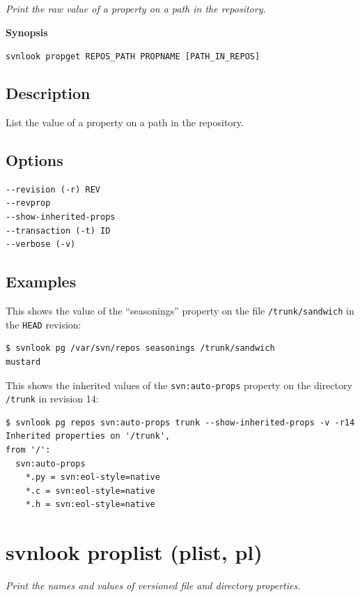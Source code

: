 \emph{Print the raw value of a property on a path in the repository.}

\textbf{Synopsis}

\texttt{svnlook\ propget\ REPOS\_PATH\ PROPNAME\ {[}PATH\_IN\_REPOS{]}}

\subsection{Description}

List the value of a property on a path in the repository.

\subsection{Options}

\begin{verbatim}
--revision (-r) REV
--revprop
--show-inherited-props
--transaction (-t) ID
--verbose (-v)
\end{verbatim}

\subsection{Examples}

This shows the value of the ``seasonings'' property on the file
\texttt{/trunk/sandwich} in the \texttt{HEAD} revision:

\begin{verbatim}
$ svnlook pg /var/svn/repos seasonings /trunk/sandwich
mustard
\end{verbatim}

This shows the inherited values of the \texttt{svn:auto-props} property
on the directory \texttt{/trunk} in revision 14:

\begin{verbatim}
$ svnlook pg repos svn:auto-props trunk --show-inherited-props -v -r14
Inherited properties on '/trunk',
from '/':
  svn:auto-props
    *.py = svn:eol-style=native
    *.c = svn:eol-style=native
    *.h = svn:eol-style=native
\end{verbatim}

\section{svnlook proplist (plist, pl)}\label{svn.ref.svnlook.c.proplist}

\emph{Print the names and values of versioned file and directory
properties.}

